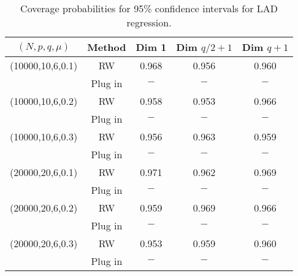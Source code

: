 \documentclass[12pt]{article}
\begin{document}
\begin{table}[!h]
	\centering
	\caption{Coverage probabilities for 95\% confidence intervals for LAD regression. }
	\medskip
	\label{tab:sim3}
	\begin{tabular}{ccccc}
		\hline
		$(N, p, q, \mu)$ & Method &Dim 1& Dim $q/2+1$ & Dim $q+1$\\
		\hline\hline
		(10000,10,6,0.1) & RW & 0.968& 0.956& 0.960\\
		&Plug in & $-$& $-$& $-$\\
		\hline
		(10000,10,6,0.2) & RW & 0.958& 0.953& 0.966\\
		&Plug in & $-$& $-$& $-$\\
		\hline
		(10000,10,6,0.3) & RW & 0.956& 0.963& 0.959\\
		&Plug in & $-$& $-$& $-$\\
		\hline
		(20000,20,6,0.1) & RW & 0.971& 0.962& 0.969\\
		&Plug in & $-$& $-$& $-$\\
		\hline
		(20000,20,6,0.2)& RW & 0.959& 0.969&0.966\\
		&Plug in & $-$& $-$& $-$\\
		\hline
		(20000,20,6,0.3) & RW & 0.953& 0.959& 0.960\\
		&Plug in & $-$& $-$& $-$\\
		\hline
	\end{tabular}
\end{table}
\end{document}
